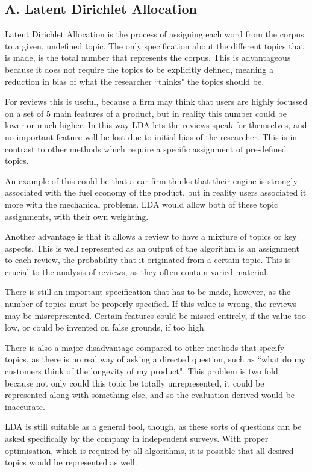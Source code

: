 \documentclass[onecolumn,prl,aps,10pt]{revtex4}
\begin{document}
\subsection{A. Latent Dirichlet Allocation}
Latent Dirichlet Allocation is the process of assigning each word from the corpus to a given, undefined topic. The only specification about the different topics that is made, is the total number that represents the corpus. This is advantageous because it does not require the topics to be explicitly defined, meaning a reduction in bias of what the researcher \textquotedblleft thinks" the topics should be. 

For reviews this is useful, because a firm may think that users are highly focussed on a set of 5 main features of a product, but in reality this number could be lower or much higher. In this way LDA lets the reviews speak for themselves, and no important feature will be lost due to initial bias of the researcher. This is in contrast to other methods which require a specific assignment of pre-defined topics.

An example of this could be that a car firm thinks that their engine is strongly associated with the fuel economy of the product, but in reality users associated it more with the mechanical problems. LDA would allow both of these topic assignments, with their own weighting.

Another advantage is that it allows a review to have a mixture of topics or key aspects. This is well represented as an output of the algorithm is an assignment to each review, the probability that it originated from a certain topic. This is crucial to the analysis of reviews, as they often contain varied material.

There is still an important specification that has to be made, however, as the number of topics must be properly specified. If this value is wrong, the reviews may be misrepresented. Certain features could be missed entirely, if the value too low, or could be invented on false grounds, if too high.

There is also a major disadvantage compared to other methods that specify topics, as there is no real way of asking a directed question, such as \textquotedblleft what do my customers think of the longevity of my product". This problem is two fold because not only could this topic be totally unrepresented, it could be represented along with something else, and so the evaluation derived would be inaccurate.

LDA is still suitable as a general tool, though, as these sorts of questions can be asked specifically by the company in independent surveys. With proper optimisation, which is required by all algorithms, it is possible that all desired topics would be represented as well.
\end{document}
